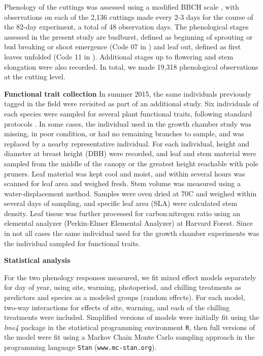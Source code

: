 \documentclass[11pt]{article}
\begin{document}
Phenology of the cuttings was assessed using a modified BBCH scale \cite{Finn:2007}, with observations on each of the 2,136 cuttings made every 2-3 days for the course of the 82-day experiment, a total of 48 observation days. The phenological stages assessed in the present study are budburst, defined as beginning of sprouting or bud breaking or shoot emergence (Code 07 in \cite{Finn:2007}) and leaf out, defined as first leaves unfolded (Code 11 in \cite{Finn:2007}). Additional stages up to flowering and stem elongation were also recorded. In total, we made 19,318 phenological observations at the cutting level.

\textbf{Functional trait collection}
In summer 2015, the same individuals previously tagged in the field were revisited as part of an additional study. Six individuals of each species were sampled for several plant functional traits, following standard protocols \cite{Perez-Harguindeguy:2013aa}. In some cases, the individual used in the growth chamber study was missing, in poor condition, or had no remaining branches to sample, and was replaced by a nearby representative individual. For each individual, height and diameter at breast height (DBH) were recorded, and leaf and stem material were sampled from the middle of the canopy or the greatest height reachable with pole pruners. Leaf material was kept cool and moist, and within several hours was scanned for leaf area and weighed fresh. Stem volume was measured using a water-displacement method. Samples were oven dried at 70\degree C and weighed within several days of sampling, and specific leaf area (SLA) were calculated stem density. Leaf tissue was further processed for carbon:nitrogen ratio using an elemental analyzer (Perkin-Elmer Elemental Analyzer) at Harvard Forest. Since in not all cases the same individual used for the growth chamber experiments was the individual sampled for functional traits.

\textbf{Statistical analysis}

For the two phenology responses measured, we fit mixed effect models separately for day of year, using site, warming, photoperiod, and chilling treatments as predictors and species as a modeled groups (random effects). For each model, two-way interactions for effects of site, warming, and each of the chilling treatments were included. Simplified versions of models were initially fit using the \emph{lme4} package in the statistical programming environment \texttt{R}, then full versions of the model were fit using a Markov Chain Monte Carlo sampling approach in the programming language \texttt{Stan} (\texttt{www.mc-stan.org}).
\end{document}
